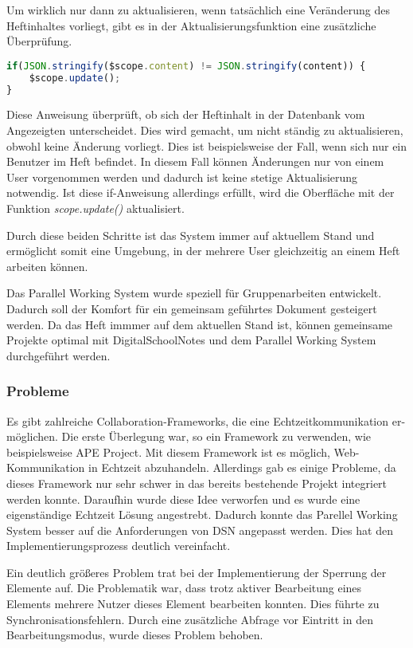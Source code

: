 \newpage

Um wirklich nur dann zu aktualisieren, wenn tatsächlich eine Veränderung des Heftinhaltes vorliegt, gibt es in der Aktualisierungsfunktion eine zusätzliche Überprüfung. 
\begin{lstlisting}[caption={Synchronisation - PWS}, language=Javascript]
if(JSON.stringify($scope.content) != JSON.stringify(content)) {
	$scope.update();
}
\end{lstlisting}
Diese Anweisung überprüft, ob sich der Heftinhalt in der Datenbank vom Angezeigten unterscheidet. Dies wird gemacht, um nicht ständig zu aktualisieren, obwohl keine Änderung vorliegt. Dies ist beispielsweise der Fall, wenn sich nur ein Benutzer im Heft befindet. In diesem Fall können Änderungen nur von einem User vorgenommen werden und dadurch ist keine stetige Aktualisierung notwendig. Ist diese if-Anweisung allerdings erfüllt, wird die Oberfläche mit der Funktion \textit{scope.update()} aktualisiert.

Durch diese beiden Schritte ist das System immer auf aktuellem Stand und ermöglicht somit eine Umgebung, in der mehrere User gleichzeitig an einem Heft arbeiten können.

Das Parallel Working System wurde speziell für Gruppenarbeiten entwickelt. Dadurch soll der Komfort für ein gemeinsam geführtes Dokument gesteigert werden. Da das Heft immmer auf dem aktuellen Stand ist, können gemeinsame Projekte optimal mit DigitalSchoolNotes und dem Parallel Working System  durchgeführt werden. 
 
\subsubsection{Probleme}
Es gibt zahlreiche Collaboration-Frameworks, die eine Echtzeitkommunikation er-\\möglichen. Die erste Überlegung war, so ein Framework zu verwenden, wie beispielsweise APE Project\cite{APE}. Mit diesem Framework ist es möglich, Web-Kommunikation in Echtzeit abzuhandeln. Allerdings gab es einige Probleme, da dieses Framework nur sehr schwer in das bereits bestehende Projekt integriert werden konnte. Daraufhin wurde diese Idee verworfen und es wurde eine eigenständige Echtzeit Lösung angestrebt. Dadurch konnte das Parellel Working System besser auf die Anforderungen von DSN angepasst werden. Dies hat den Implementierungsprozess deutlich vereinfacht.

Ein deutlich größeres Problem trat bei der Implementierung der Sperrung der Elemente auf. Die Problematik war, dass trotz aktiver Bearbeitung eines Elements mehrere Nutzer dieses Element bearbeiten konnten. Dies führte zu Synchronisationsfehlern. Durch eine zusätzliche Abfrage vor Eintritt in den Bearbeitungsmodus, wurde dieses Problem behoben. 

